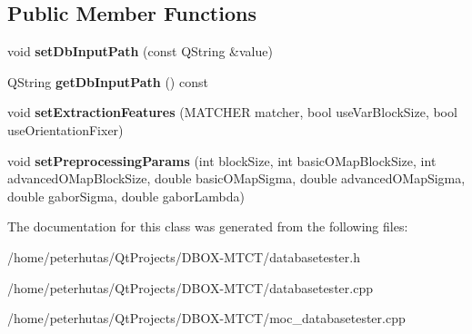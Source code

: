 \subsection*{Public Member Functions}
\begin{DoxyCompactItemize}
\item 
\mbox{\label{class_database_tester_abee674001d265d20267270064dd1ccb7}} 
void {\bfseries set\+Db\+Input\+Path} (const Q\+String \&value)
\item 
\mbox{\label{class_database_tester_af99ba6c604d5ea5b95aa338800adc568}} 
Q\+String {\bfseries get\+Db\+Input\+Path} () const
\item 
\mbox{\label{class_database_tester_ad3ca20ab318333ac0dfeb7a0f8f29a38}} 
void {\bfseries set\+Extraction\+Features} (M\+A\+T\+C\+H\+ER matcher, bool use\+Var\+Block\+Size, bool use\+Orientation\+Fixer)
\item 
\mbox{\label{class_database_tester_a69de67f2654aaa086e59a9883b29e909}} 
void {\bfseries set\+Preprocessing\+Params} (int block\+Size, int basic\+O\+Map\+Block\+Size, int advanced\+O\+Map\+Block\+Size, double basic\+O\+Map\+Sigma, double advanced\+O\+Map\+Sigma, double gabor\+Sigma, double gabor\+Lambda)
\end{DoxyCompactItemize}


The documentation for this class was generated from the following files\+:\begin{DoxyCompactItemize}
\item 
/home/peterhutas/\+Qt\+Projects/\+D\+B\+O\+X-\/\+M\+T\+C\+T/databasetester.\+h\item 
/home/peterhutas/\+Qt\+Projects/\+D\+B\+O\+X-\/\+M\+T\+C\+T/databasetester.\+cpp\item 
/home/peterhutas/\+Qt\+Projects/\+D\+B\+O\+X-\/\+M\+T\+C\+T/moc\+\_\+databasetester.\+cpp\end{DoxyCompactItemize}
